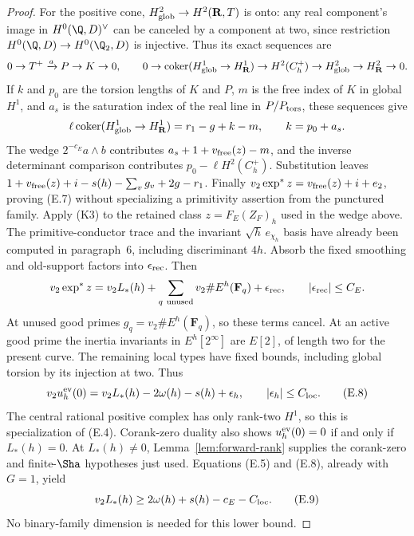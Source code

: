 \begin{proof}
For the positive cone, $H^2_{\rm glob}\to H^2(\mathbf R,T)$ is onto:
any real component's image in $H^0(\Q,D)^\vee$ can be canceled by
a component at two, since restriction
$H^0(\Q,D)\to H^0(\Q_2,D)$ is injective. Thus its exact sequences are
\[
0\to T^+\xrightarrow{a}P\to K\to0,\qquad
0\to\operatorname{coker}(H^1_{\rm glob}\to H^1_{\mathbf R})
 \to H^2(C_h^+)\to H^2_{\rm glob}\to H^2_{\mathbf R}\to0.
\]
If $k$ and $p_0$ are the torsion lengths of $K$ and $P$, $m$ is the
free index of $K$ in global $H^1$, and $a_s$ is the saturation index
of the real line in $P/P_{\rm tors}$, these sequences give
\[
\ell\operatorname{coker}(H^1_{\rm glob}\to H^1_{\mathbf R})
 =r_1-g+k-m,\qquad k=p_0+a_s.
\]
The wedge $2^{-c_E}a\wedge b$ contributes
$a_s+1+v_{\rm free}(z)-m$, and the inverse determinant comparison
contributes $p_0-\ell H^2(C_h^+)$. Substitution leaves
$1+v_{\rm free}(z)+i-s(h)-\sum_vg_v+2g-r_1$.
Finally $v_2\exp^*z=v_{\rm free}(z)+i+e_2$, proving (E.7)
without specializing a primitivity assertion from the punctured
family.
Apply (K3) to the retained class $z=F_E(Z_F)_h$ used in the wedge
above. The primitive-conductor trace and the invariant
$\sqrt h\,e_{\chi_h}$ basis have already been computed in
paragraph~6, including discriminant $4h$. Absorb the fixed
smoothing and old-support factors into $\epsilon_{\rm rec}$.
Then
\[
 v_2\exp^*z
 =v_2L_*(h)+\sum_{q\ {\rm unused}}v_2\#E^h(\mathbf F_q)
                         +\epsilon_{\rm rec},\qquad
 |\epsilon_{\rm rec}|\le C_E.
\]
At unused good primes $g_q=v_2\#E^h(\mathbf F_q)$, so these
terms cancel. At an active good prime the inertia invariants in
$E^h[2^\infty]$ are $E[2]$, of length two for the present curve.
The remaining local types have fixed bounds, including global
torsion by its injection at two.
Thus
\[
 v_2u_h^{\rm ev}(0)=v_2L_*(h)-2\omega(h)-s(h)+\epsilon_h,\qquad
 |\epsilon_h|\le C_{\rm loc}.                                  \tag{E.8}
\]
The central rational positive complex has only rank-two $H^1$, so
this is specialization of (E.4). Corank-zero duality also shows
$u_h^{\rm ev}(0)=0$ if and only if $L_*(h)=0$.
At $L_*(h)\ne0$, Lemma~\ref{lem:forward-rank} supplies the
corank-zero and finite-$\Sha$ hypotheses just used.
Equations (E.5) and (E.8), already with $G=1$, yield
\[
          v_2L_*(h)\ge2\omega(h)+s(h)-c_E-C_{\rm loc}.             \tag{E.9}
\]
No binary-family dimension is needed for this lower bound.
\end{proof}

